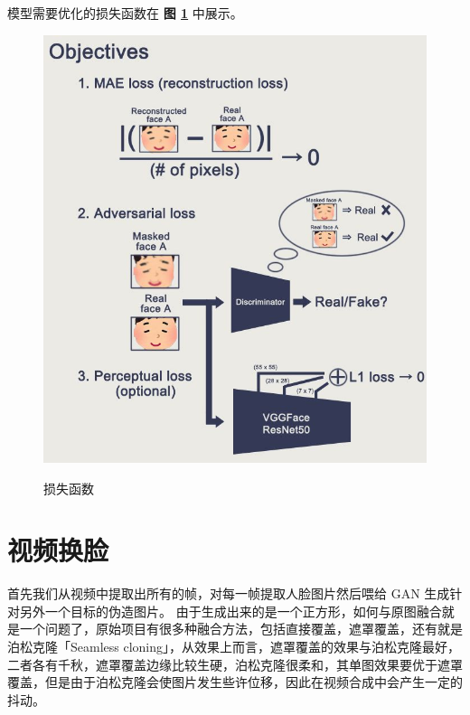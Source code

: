 模型需要优化的损失函数在 \textbf{图 \ref{fig:loss}} 中展示。


\begin{figure}[h!]
	\caption{损失函数}
	\centering
	\includegraphics[width=\textwidth]{figure/resources/loss.jpg}
	\label{fig:loss}
\end{figure}


\section{视频换脸}
首先我们从视频中提取出所有的帧，对每一帧提取人脸图片然后喂给 GAN 生成针对另外一个目标的伪造图片。
由于生成出来的是一个正方形，如何与原图融合就是一个问题了，原始项目有很多种融合方法，包括直接覆盖，遮罩覆盖，还有就是泊松克隆「Seamless cloning」，从效果上而言，遮罩覆盖的效果与泊松克隆最好，二者各有千秋，遮罩覆盖边缘比较生硬，泊松克隆很柔和，其单图效果要优于遮罩覆盖，但是由于泊松克隆会使图片发生些许位移，因此在视频合成中会产生一定的抖动。

